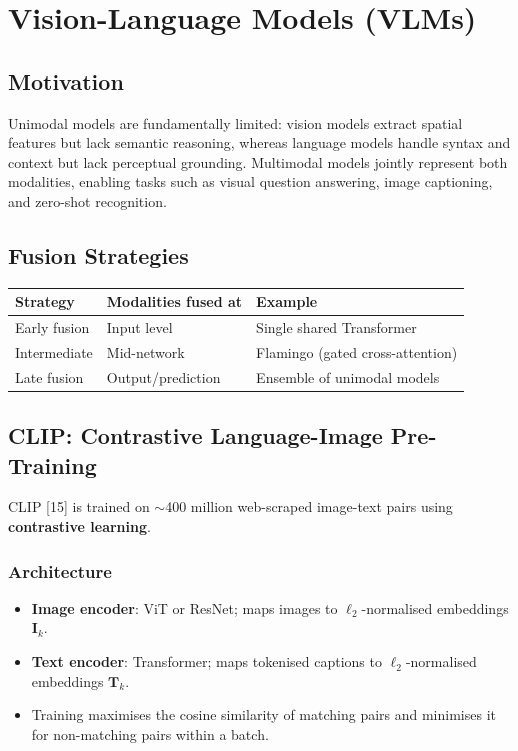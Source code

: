 \documentclass[12pt,a4paper]{report}
\newcommand{\vect}[1]{\mathbf{#1}}
\begin{document}
\chapter{Vision-Language Models (VLMs)}

\section{Motivation}

Unimodal models are fundamentally limited: vision models extract spatial
features but lack semantic reasoning, whereas language models handle syntax
and context but lack perceptual grounding.  Multimodal models jointly
represent both modalities, enabling tasks such as visual question answering,
image captioning, and zero-shot recognition.

\section{Fusion Strategies}

\begin{center}
\begin{tabular}{lll}
\toprule
Strategy & Modalities fused at & Example \\
\midrule
Early fusion  & Input level       & Single shared Transformer \\
Intermediate  & Mid-network       & Flamingo (gated cross-attention) \\
Late fusion   & Output/prediction & Ensemble of unimodal models \\
\bottomrule
\end{tabular}
\end{center}

\section{CLIP: Contrastive Language-Image Pre-Training}

CLIP [15] is trained on $\sim$400 million web-scraped
image-text pairs using \textbf{contrastive learning}.

\subsection{Architecture}

\begin{itemize}[itemsep=1pt]
    \item \textbf{Image encoder}: ViT or ResNet; maps images to
          $\ell_2$-normalised embeddings $\vect{I}_k$.
    \item \textbf{Text encoder}: Transformer; maps tokenised captions to
          $\ell_2$-normalised embeddings $\vect{T}_k$.
    \item Training maximises the cosine similarity of matching pairs and
          minimises it for non-matching pairs within a batch.
\end{itemize}
\end{document}
